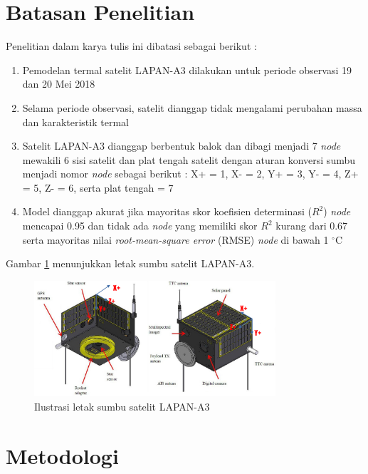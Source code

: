 \section{Batasan Penelitian}

Penelitian dalam karya tulis ini dibatasi sebagai berikut :

\begin{enumerate}
\item Pemodelan termal satelit LAPAN-A3 dilakukan untuk periode observasi 19 dan 20 Mei 2018
\item Selama periode observasi, satelit dianggap tidak mengalami perubahan massa dan karakteristik termal
\item Satelit LAPAN-A3 dianggap berbentuk balok dan dibagi menjadi 7
	\textit{node} mewakili 6 sisi satelit dan plat tengah satelit dengan aturan
		konversi sumbu menjadi nomor \textit{node} sebagai berikut : X+ = 1, X- =
		2, Y+ = 3, Y- = 4, Z+ = 5, Z- = 6, serta plat tengah = 7
	\item Model dianggap akurat jika mayoritas skor koefisien determinasi ($R^2$) \textit{node} mencapai 0.95 dan tidak ada \textit{node} yang memiliki skor $R^2$ kurang dari 0.67 serta mayoritas nilai \textit{root-mean-square error} (RMSE) \textit{node} di bawah 1 $^\circ$C
\end{enumerate}

Gambar \ref{fig:sumbua3} menunjukkan letak sumbu satelit LAPAN-A3.

\begin{figure}[H]
\setlength{}
\begin{center}
\includegraphics[width=0.8\textwidth]{fig/sumbua3.png}
\caption{Ilustrasi letak sumbu satelit LAPAN-A3}
\label{fig:sumbua3}
\end{center}
\end{figure}


\section{Metodologi}

